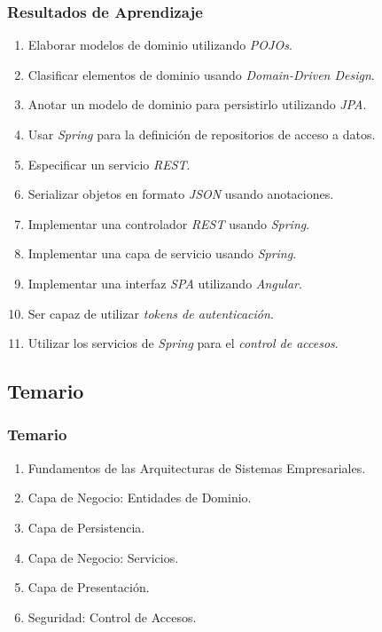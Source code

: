 \documentclass[handout,a4paper,t,xcolor=pst,colortheme]{beamer}
\begin{document}
\begin{frame}[c]
   \frametitle{Resultados de Aprendizaje}
   \begin{enumerate}[<+->]
        \item Elaborar modelos de dominio utilizando \emph{POJOs}.
        \item Clasificar elementos de dominio usando \emph{Domain-Driven Design}.
        \item Anotar un modelo de dominio para persistirlo utilizando \emph{JPA}.
        \item Usar \emph{Spring} para la definición de repositorios de acceso a datos.
        \item Especificar un servicio \emph{REST}.
        \item Serializar objetos en formato \emph{JSON} usando anotaciones.
        \item Implementar una controlador \emph{REST} usando \emph{Spring}.
        \item Implementar una capa de servicio usando \emph{Spring}.
        \item Implementar una interfaz \emph{SPA} utilizando \emph{Angular}.
        \item Ser capaz de utilizar \emph{tokens de autenticación}.
        \item Utilizar los servicios de \emph{Spring} para el \emph{control de accesos}.
	\end{enumerate}
\end{frame}

\subsection{Temario}

\begin{frame}[c]
	\frametitle{Temario}
	\begin{enumerate}
		\item<1-> Fundamentos de las Arquitecturas de Sistemas Empresariales.
		\item<2-> Capa de Negocio: Entidades de Dominio.
		\item<3-> Capa de Persistencia.
		\item<4-> Capa de Negocio: Servicios.
		\item<5-> Capa de Presentación.
        \item<6-> Seguridad: Control de Accesos.
	\end{enumerate}
\end{frame}
\end{document}
